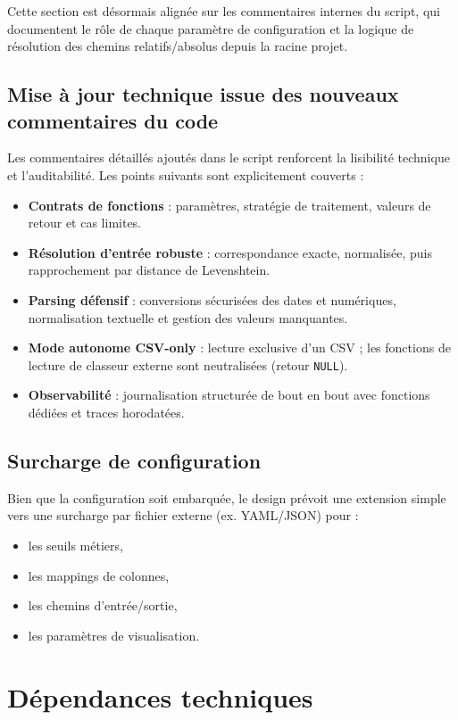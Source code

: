 \documentclass[11pt,a4paper]{article}
\begin{document}
Cette section est d\'esormais align\'ee sur les commentaires internes du script,
qui documentent le rôle de chaque paramètre de configuration et la logique de
r\'esolution des chemins relatifs/absolus depuis la racine projet.

\subsection{Mise à jour technique issue des nouveaux commentaires du code}
Les commentaires d\'etaill\'es ajout\'es dans le script renforcent la lisibilit\'e
technique et l'auditabilit\'e. Les points suivants sont explicitement couverts :
\begin{itemize}[leftmargin=1.2cm]
  \item \textbf{Contrats de fonctions} : paramètres, strat\'egie de traitement,
  valeurs de retour et cas limites.
  \item \textbf{R\'esolution d'entr\'ee robuste} : correspondance exacte,
  normalis\'ee, puis rapprochement par distance de Levenshtein.
  \item \textbf{Parsing d\'efensif} : conversions s\'ecuris\'ees des dates et
  num\'eriques, normalisation textuelle et gestion des valeurs manquantes.
  \item \textbf{Mode autonome CSV-only} : lecture exclusive d'un CSV ; les fonctions
  de lecture de classeur externe sont neutralis\'ees (retour \texttt{NULL}).
  \item \textbf{Observabilit\'e} : journalisation structur\'ee de bout en bout avec
  fonctions d\'edi\'ees et traces horodat\'ees.
\end{itemize}

\subsection{Surcharge de configuration}
Bien que la configuration soit embarqu\'ee, le design pr\'evoit une extension simple
vers une surcharge par fichier externe (ex. YAML/JSON) pour :
\begin{itemize}[leftmargin=1.2cm]
  \item les seuils m\'etiers,
  \item les mappings de colonnes,
  \item les chemins d'entr\'ee/sortie,
  \item les paramètres de visualisation.
\end{itemize}

\section{D\'ependances techniques}
\end{document}
